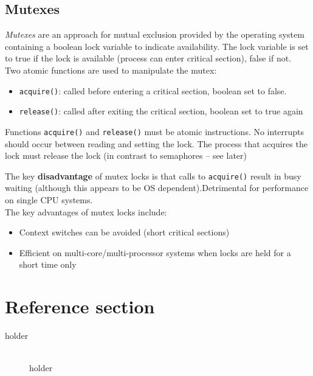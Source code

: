 \documentclass{article}
\begin{document}
\subsection{Mutexes}
\begin{flushleft}
\textit{Mutexes} are an approach for mutual exclusion provided by the operating system containing a boolean lock variable to indicate availability. The lock variable is set to true if the lock is available (process can enter critical section), false if not.\\
Two atomic functions are used to manipulate the mutex:
\begin{itemize}
	\item \texttt{acquire()}: called before entering a critical section, boolean set to false.
	\item \texttt{release()}: called after exiting the critical section, boolean set to true again
\end{itemize}

Functions \texttt{acquire()} and \texttt{release()} must be atomic instructions. No interrupts should occur between reading and setting the lock. The process that acquires the lock must release the lock (in contrast to semaphores – see later)
\bigskip

The key \textbf{disadvantage} of mutex locks is that calls to \texttt{acquire()} result in busy waiting (although this appears to be OS dependent).Detrimental for performance on single CPU systems.\\
The key advantages of mutex locks include:
\begin{itemize}
	\item Context switches can be avoided (short critical sections)
	\item Efficient on multi-core/multi-processor systems when locks are held for a short time only
\end{itemize}
\end{flushleft}

\pagebreak
\section*{Reference section} \label{sec:reference}
\begin{description}
	\item[holder] \hfill \\ holder
\end{description}
\end{document}
